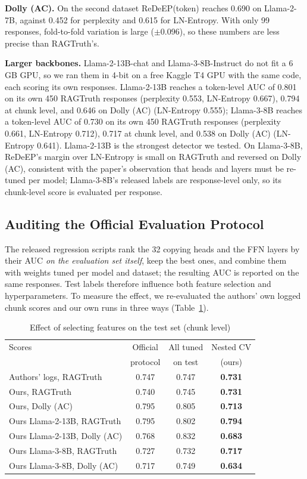 \documentclass[conference]{IEEEtran}
\begin{document}
\textbf{Dolly (AC).} On the second dataset ReDeEP(token) reaches 0.690 on Llama-2-7B, against 0.452 for perplexity and 0.615 for LN-Entropy. With only 99 responses, fold-to-fold variation is large ($\pm$0.096), so these numbers are less precise than RAGTruth's.

\textbf{Larger backbones.} Llama-2-13B-chat and Llama-3-8B-Instruct do not fit a 6\,GB GPU, so we ran them in 4-bit on a free Kaggle T4 GPU with the same code, each scoring its own responses. Llama-2-13B reaches a token-level AUC of 0.801 on its own 450 RAGTruth responses (perplexity 0.553, LN-Entropy 0.667), 0.794 at chunk level, and 0.646 on Dolly (AC) (LN-Entropy 0.555); Llama-3-8B reaches a token-level AUC of 0.730 on its own 450 RAGTruth responses (perplexity 0.661, LN-Entropy 0.712), 0.717 at chunk level, and 0.538 on Dolly (AC) (LN-Entropy 0.641). Llama-2-13B is the strongest detector we tested. On Llama-3-8B, ReDeEP's margin over LN-Entropy is small on RAGTruth and reversed on Dolly (AC), consistent with the paper's observation that heads and layers must be re-tuned per model; Llama-3-8B's released labels are response-level only, so its chunk-level score is evaluated per response.

\subsection{Auditing the Official Evaluation Protocol}
\label{sec:audit}
The released regression scripts rank the 32 copying heads and the FFN layers by their AUC \emph{on the evaluation set itself}, keep the best ones, and combine them with weights tuned per model and dataset; the resulting AUC is reported on the same responses. Test labels therefore influence both feature selection and hyperparameters. To measure the effect, we re-evaluated the authors' own logged chunk scores and our own runs in three ways (Table~\ref{tab:audit}).

\begin{table}[t]
\caption{Effect of selecting features on the test set (chunk level)}
\label{tab:audit}
\centering\footnotesize
\setlength{\tabcolsep}{3pt}
\begin{tabular}{@{}lccc@{}}
\toprule
Scores & Official & All tuned & Nested CV \\
& protocol & on test & (ours) \\
\midrule
Authors' logs, RAGTruth & 0.747 & 0.747 & \textbf{0.731} \\
Ours, RAGTruth & 0.740 & 0.745 & \textbf{0.731} \\
Ours, Dolly (AC) & 0.795 & 0.805 & \textbf{0.713} \\
Ours Llama-2-13B, RAGTruth & 0.795 & 0.802 & \textbf{0.794} \\
Ours Llama-2-13B, Dolly (AC) & 0.768 & 0.832 & \textbf{0.683} \\
Ours Llama-3-8B, RAGTruth & 0.727 & 0.732 & \textbf{0.717} \\
Ours Llama-3-8B, Dolly (AC) & 0.717 & 0.749 & \textbf{0.634} \\
\bottomrule
\end{tabular}
\end{table}
\end{document}
